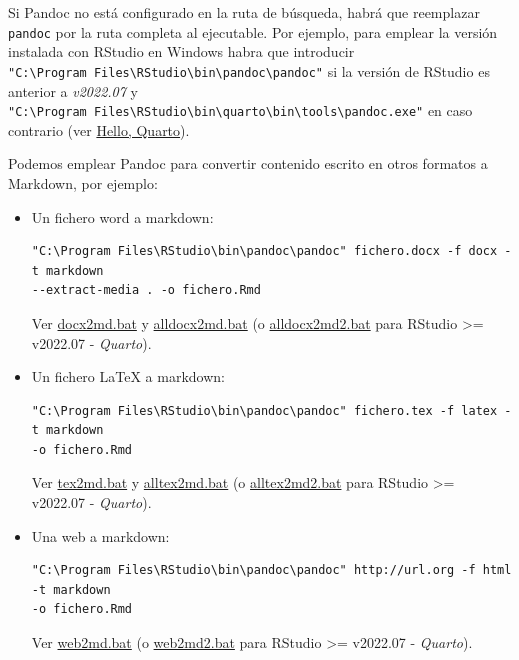 \documentclass[
]{book}
\theoremstyle{break}
\theoremstyle{nonumberplain}
\begin{document}
Si Pandoc no está configurado en la ruta de búsqueda, habrá que reemplazar \texttt{pandoc} por la ruta completa al ejecutable.
Por ejemplo, para emplear la versión instalada con RStudio en Windows habra que introducir \texttt{"C:\textbackslash{}Program\ Files\textbackslash{}RStudio\textbackslash{}bin\textbackslash{}pandoc\textbackslash{}pandoc"} si la versión de RStudio es anterior a \emph{v2022.07} y \texttt{"C:\textbackslash{}Program\ Files\textbackslash{}RStudio\textbackslash{}bin\textbackslash{}quarto\textbackslash{}bin\textbackslash{}tools\textbackslash{}pandoc.exe"} en caso contrario (ver \href{https://quarto.org/docs/get-started/hello/rstudio.html}{Hello, Quarto}).

Podemos emplear Pandoc para convertir contenido escrito en otros formatos a Markdown, por ejemplo:

\begin{itemize}
\item
  Un fichero word a markdown:

\begin{verbatim}
"C:\Program Files\RStudio\bin\pandoc\pandoc" fichero.docx -f docx -t markdown 
--extract-media . -o fichero.Rmd 
\end{verbatim}

  Ver \href{ejemplos/rmarkdown/docx2md.bat}{docx2md.bat} y \href{ejemplos/rmarkdown/alldocx2md.bat}{alldocx2md.bat} (o \href{ejemplos/rmarkdown/alldocx2md2.bat}{alldocx2md2.bat} para RStudio \textgreater= v2022.07 - \emph{Quarto}).
\item
  Un fichero LaTeX a markdown:

\begin{verbatim}
"C:\Program Files\RStudio\bin\pandoc\pandoc" fichero.tex -f latex -t markdown 
-o fichero.Rmd 
\end{verbatim}

  Ver \href{ejemplos/rmarkdown/tex2md.bat}{tex2md.bat} y \href{ejemplos/rmarkdown/alltex2md.bat}{alltex2md.bat} (o \href{ejemplos/rmarkdown/alltex2md2.bat}{alltex2md2.bat} para RStudio \textgreater= v2022.07 - \emph{Quarto}).
\item
  Una web a markdown:

\begin{verbatim}
"C:\Program Files\RStudio\bin\pandoc\pandoc" http://url.org -f html -t markdown 
-o fichero.Rmd
\end{verbatim}

  Ver \href{ejemplos/rmarkdown/web2md.bat}{web2md.bat} (o \href{ejemplos/rmarkdown/web2md2.bat}{web2md2.bat} para RStudio \textgreater= v2022.07 - \emph{Quarto}).
\end{itemize}
\end{document}
